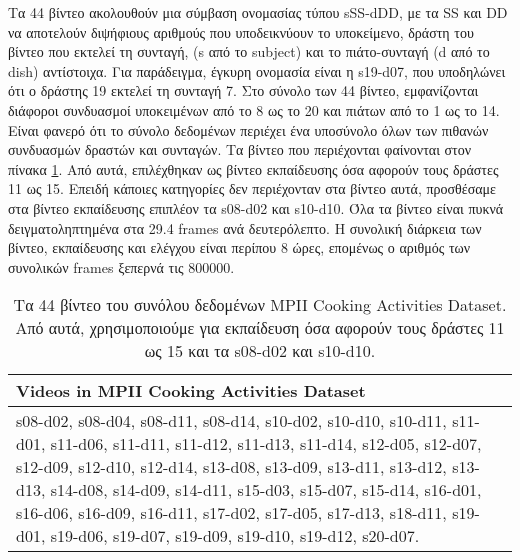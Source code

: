 \par Τα 44 βίντεο ακολουθούν μια σύμβαση ονομασίας τύπου sSS-dDD, με τα SS και DD να αποτελούν διψήφιους αριθμούς που υποδεικνύουν το υποκείμενο, δράστη του βίντεο που εκτελεί τη συνταγή, (s από το subject) και το πιάτο-συνταγή (d από το dish) αντίστοιχα. Για παράδειγμα, έγκυρη ονομασία είναι η s19-d07, που υποδηλώνει ότι ο δράστης 19 εκτελεί τη συνταγή 7. Στο σύνολο των 44 βίντεο, εμφανίζονται διάφοροι συνδυασμοί υποκειμένων από το 8 ως το 20 και πιάτων από το 1 ως το 14. Είναι φανερό ότι το σύνολο δεδομένων περιέχει ένα υποσύνολο όλων των πιθανών συνδυασμών δραστών και συνταγών. Τα βίντεο που περιέχονται φαίνονται στον πίνακα \ref{tab:DataVideos}. Από αυτά, επιλέχθηκαν ως βίντεο εκπαίδευσης όσα αφορούν τους δράστες 11 ως 15. Επειδή κάποιες κατηγορίες δεν περιέχονταν στα βίντεο αυτά, προσθέσαμε στα βίντεο εκπαίδευσης επιπλέον τα s08-d02 και s10-d10. Όλα τα βίντεο είναι πυκνά δειγματοληπτημένα στα 29.4 frames ανά δευτερόλεπτο. Η συνολική διάρκεια των βίντεο, εκπαίδευσης και ελέγχου είναι περίπου 8 ώρες, επομένως ο αριθμός των συνολικών frames ξεπερνά τις 800000.

\begin{table}
    \begin{tabular}{|p{13.5cm}|}
    \hline
    Videos in MPII Cooking Activities Dataset \\ \hline
    s08-d02, s08-d04, s08-d11, s08-d14, s10-d02, s10-d10, s10-d11, s11-d01, s11-d06, s11-d11, s11-d12, s11-d13, s11-d14, s12-d05, s12-d07, s12-d09, s12-d10, s12-d14, s13-d08, s13-d09, s13-d11, s13-d12, s13-d13, s14-d08, s14-d09, s14-d11, s15-d03, s15-d07, s15-d14, s16-d01, s16-d06, s16-d09, s16-d11, s17-d02, s17-d05, s17-d13, s18-d11, s19-d01, s19-d06, s19-d07, s19-d09, s19-d10, s19-d12, s20-d07. \\
    \hline
    \end{tabular}
	\caption{Τα 44 βίντεο του συνόλου δεδομένων MPII Cooking Activities Dataset. Από αυτά, χρησιμοποιούμε για εκπαίδευση όσα αφορούν τους δράστες 11 ως 15 και τα s08-d02 και s10-d10.}
	\label{tab:DataVideos}
\end{table}


